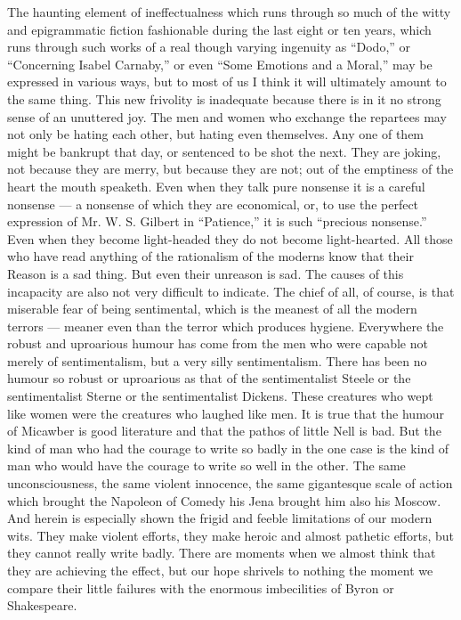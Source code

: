 The haunting element of ineffectualness which runs through so much of the witty and epigrammatic fiction fashionable during the last eight or ten years, which runs through such works of a real though varying ingenuity as “Dodo,” or “Concerning Isabel Carnaby,” or even “Some Emotions and a Moral,” may be expressed in various ways, but to most of us I think it will ultimately amount to the same thing. This new frivolity is inadequate because there is in it no strong sense of an unuttered joy. The men and women who exchange the repartees may not only be hating each other, but hating even themselves. Any one of them might be bankrupt that day, or sentenced to be shot the next. They are joking, not because they are merry, but because they are not; out of the emptiness of the heart the mouth speaketh. Even when they talk pure nonsense it is a careful nonsense — a nonsense of which they are economical, or, to use the perfect expression of Mr. W. S. Gilbert in “Patience,” it is such “precious nonsense.” Even when they become light-headed they do not become light-hearted. All those who have read anything of the rationalism of the moderns know that their Reason is a sad thing. But even their unreason is sad. The causes of this incapacity are also not very difficult to indicate. The chief of all, of course, is that miserable fear of being sentimental, which is the meanest of all the modern terrors — meaner even than the terror which produces hygiene. Everywhere the robust and uproarious humour has come from the men who were capable not merely of sentimentalism, but a very silly sentimentalism. There has been no humour so robust or uproarious as that of the sentimentalist Steele or the sentimentalist Sterne or the sentimentalist Dickens. These creatures who wept like women were the creatures who laughed like men. It is true that the humour of Micawber is good literature and that the pathos of little Nell is bad. But the kind of man who had the courage to write so badly in the one case is the kind of man who would have the courage to write so well in the other. The same unconsciousness, the same violent innocence, the same gigantesque scale of action which brought the Napoleon of Comedy his Jena brought him also his Moscow. And herein is especially shown the frigid and feeble limitations of our modern wits. They make violent efforts, they make heroic and almost pathetic efforts, but they cannot really write badly. There are moments when we almost think that they are achieving the effect, but our hope shrivels to nothing the moment we compare their little failures with the enormous imbecilities of Byron or Shakespeare.

